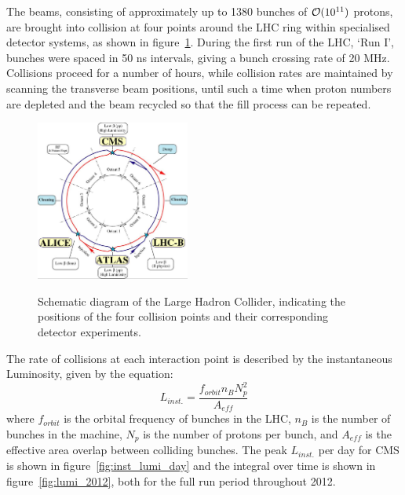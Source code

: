The beams, consisting of approximately up to 1380 bunches of $\mathcal{O}(10^{11})$
protons, are brought into collision
at four points around the LHC ring within specialised detector systems, as shown
in figure~\ref{fig:lhc_diagram}. During the
first run of the LHC, `Run I', bunches were spaced in 50 ns intervals, giving
a bunch crossing rate of 20 MHz. Collisions proceed for a number of hours, 
while collision rates are maintained by scanning the transverse beam positions, 
until such a time when proton numbers are depleted and the beam recycled so that
the fill process can be repeated.

\begin{figure}[hb!]
\centering
\includegraphics[width=0.45\textwidth]{Figs/machine/lhc-schematic.jpg}
\label{fig:lhc_diagram}
\caption{Schematic diagram of the Large Hadron Collider, indicating the 
positions of the four collision points and their corresponding detector 
experiments.}
\end{figure}

The rate of collisions at each interaction point is described by the 
instantaneous Luminosity, given by the equation:
% 
\begin{equation}
L_{inst.} = \frac{f_{orbit}n_{B}N_p^2}{A_{eff}}
\end{equation}
% 
where $f_{orbit}$ is the orbital frequency of bunches in the LHC, $n_B$ is the 
number of bunches in the machine, $N_p$ is the number of protons per bunch, and 
$A_{eff}$ is the effective area overlap between colliding bunches. The peak 
$L_{inst.}$ per day for CMS is shown in figure~\ref{fig:inst_lumi_day} and the
integral over time is shown in figure~\ref{fig:lumi_2012}, both for the full run
period throughout 2012.

